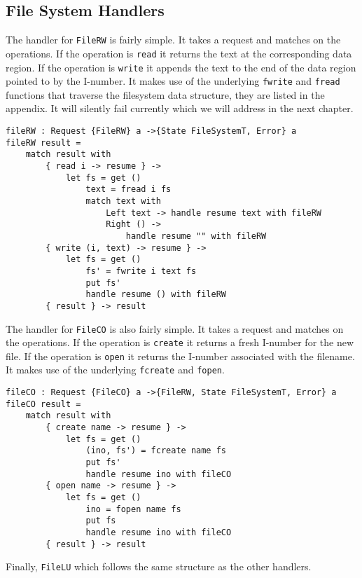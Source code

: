 \documentclass[logo,bsc,singlespacing,parskip]{infthesis}
\begin{document}
\subsection{File System Handlers}

The handler for \texttt{FileRW} is fairly simple. It takes a request and
matches on the operations. If the operation is \texttt{read} it returns the
text at the corresponding data region. If the operation is \texttt{write} it
appends the text to the end of the data region pointed to by the I-number.
It makes use of the underlying \texttt{fwrite} and \texttt{fread} functions
that traverse the filesystem data structure, they are listed in the appendix.
It will silently fail currently which we will address in the next chapter.

\begin{lstlisting}[language=unison]
fileRW : Request {FileRW} a ->{State FileSystemT, Error} a
fileRW result =
    match result with
        { read i -> resume } ->
            let fs = get ()
                text = fread i fs
                match text with
                    Left text -> handle resume text with fileRW
                    Right () -> 
                        handle resume "" with fileRW
        { write (i, text) -> resume } ->
            let fs = get ()
                fs' = fwrite i text fs
                put fs'
                handle resume () with fileRW
        { result } -> result
\end{lstlisting}

The handler for \texttt{FileCO} is also fairly simple. It takes a request and
matches on the operations. If the operation is \texttt{create} it returns a
fresh I-number for the new file. If the operation is \texttt{open} it returns
the I-number associated with the filename. It makes use of the underlying
\texttt{fcreate} and \texttt{fopen}.

\begin{lstlisting}[language=unison]
fileCO : Request {FileCO} a ->{FileRW, State FileSystemT, Error} a
fileCO result =
    match result with
        { create name -> resume } ->
            let fs = get ()
                (ino, fs') = fcreate name fs
                put fs'
                handle resume ino with fileCO
        { open name -> resume } ->
            let fs = get ()
                ino = fopen name fs
                put fs
                handle resume ino with fileCO
        { result } -> result
\end{lstlisting}

Finally, \texttt{FileLU} which follows the same structure as the other handlers.
\end{document}

